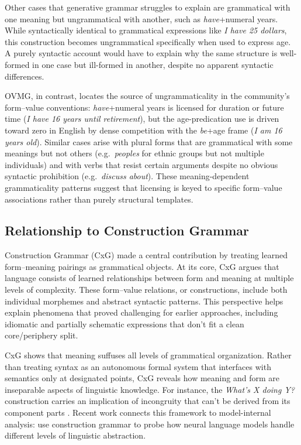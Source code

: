 \documentclass[12pt,letterpaper]{article}
\newcommand{\mention}[1]{\textit{#1}}
\begin{document}
Other cases that generative grammar struggles to explain are grammatical with
one meaning but ungrammatical with another, such as \mention{have}+numeral
years. While syntactically identical to grammatical expressions like
\mention{I have 25 dollars}, this construction becomes ungrammatical
specifically when used to express age. A purely syntactic account would have to
explain why the same structure is well-formed in one case but ill-formed in
another, despite no apparent syntactic differences.

OVMG, in contrast, locates the source of ungrammaticality in the community's
form--value conventions: \mention{have}+numeral years is licensed for duration
or future time (\mention{I have 16 years until retirement}), but the
age-predication use is driven toward zero in English by dense competition with
the \mention{be}+age frame (\mention{I am 16 years old}). Similar cases arise
with plural forms that are grammatical with some meanings but not others
(e.g.\, \mention{peoples} for ethnic groups but not multiple individuals) and
with verbs that resist certain arguments despite no obvious syntactic
prohibition (e.g.\, \mention{discuss about}). These meaning-dependent
grammaticality patterns suggest that licensing is keyed to specific form--value
associations rather than purely structural templates.

\subsection{Relationship to Construction Grammar}

Construction Grammar (CxG) \autocite{fillmore1988mechanisms, fillmore1988, kay1999grammatical, goldberg1995constructions, goldberg2019, sag2012sign} made a central contribution by treating learned form--meaning pairings as grammatical objects. At its core, CxG argues that language consists of learned relationships between form and meaning at multiple levels of complexity. These form--value relations, or constructions, include both individual morphemes and abstract syntactic patterns. This perspective helps explain phenomena that proved challenging for earlier approaches, including idiomatic and partially schematic expressions that don't fit a clean core/periphery split.

CxG shows that meaning suffuses all levels of grammatical organization. Rather than treating syntax as an autonomous formal system that interfaces with semantics only at designated points, CxG reveals how meaning and form are inseparable aspects of linguistic knowledge. For instance, the \mention{What's X doing Y?} construction carries an implication of incongruity that can't be derived from its component parts \autocite{kay1999grammatical}. Recent work connects this framework to model-internal analysis: \textcite{weissweiler2023construction} use construction grammar to probe how neural language models handle different levels of linguistic abstraction.
\end{document}
